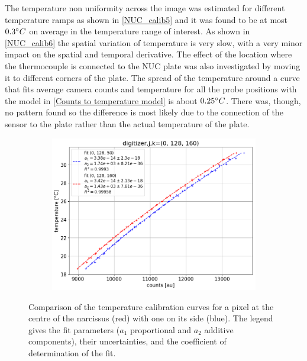 The temperature non uniformity across the image was estimated for different temperature ramps as shown in \autoref{NUC_calib5} and it was found to be at most $0.3\degree C$ on average in the temperature range of interest. As shown in \autoref{NUC_calib6} the spatial variation of temperature is very slow, with a very minor impact on the spatial and temporal derivative. The effect of the location where the thermocouple is connected to the NUC plate was also investigated by moving it to different corners of the plate. The spread of the temperature around a curve that fits average camera counts and temperature for all the probe positions with the model in \autoref{Counts to temperature model} is about $0.25\degree C$. There was, though, no pattern found so the difference is most likely due to the connection of the sensor to the plate rather than the actual temperature of the plate.

\begin{figure}
     \centering
     \begin{subfigure}{0.7\linewidth}
         \centering
         \includegraphics[trim={5 0 0 25},clip,width=\linewidth]{Chapters/chapter2/figs/example_BB_fit(0, 128, 160)2.png}
     \end{subfigure}
    \caption{Comparison of the temperature calibration curves for a pixel at the centre of the narcissus (red) with one on its side (blue). The legend gives the fit parameters ($a_1$ proportional and $a_2$ additive components), their uncertainties, and the coefficient of determination of the fit.}
    \label{fig:example_BB_fit}
\end{figure}

